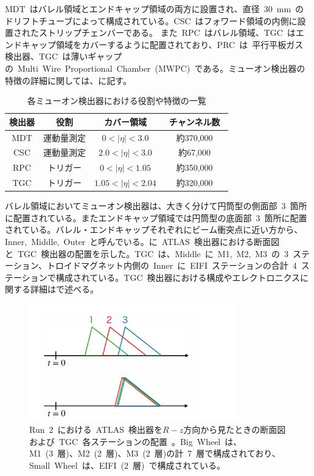 MDT~はバレル領域とエンドキャップ領域の両方に設置され、直径~30~mm~のドリフトチューブによって構成されている。CSC~はフォワード領域の内側に設置されたストリップチェンバーである。 また~RPC~はバレル領域、TGC~はエンドキャップ領域をカバーするように配置されており、PRC~は~平行平板ガス検出器、TGC~は薄いギャップの~Multi~Wire~Proportional~Chamber~(MWPC)~である。ミューオン検出器の特徴の詳細に関しては、に記す。
\begin{table}[tbp]
	\centering
	\begin{tabular}{c|ccc}\hline
	    検出器 & 役割 & カバー領域 & チャンネル数　\\ \hline\hline
		MDT & 運動量測定 & $0<|\eta|<3.0$ & 約370,000 \\ 
		CSC & 運動量測定 & $2.0<|\eta|<3.0$ & 約67,000 \\
        RPC & トリガー & $0<|\eta|<1.05$ & 約350,000 \\
        TGC & トリガー & $1.05<|\eta|<2.04$ & 約320,000 \\ \hline 
	\end{tabular}
	\caption{各ミューオン検出器における役割や特徴の一覧}
    \label{tb:muon}
\end{table}

バレル領域においてミューオン検出器は、大きく分けて円筒型の側面部~3~箇所に配置されている。またエンドキャップ領域では円筒型の底面部~3~箇所に配置されている。バレル・エンドキャップそれぞれにビーム衝突点に近い方から、Inner,~Middle,~Outer~と呼んでいる。に~ATLAS~検出器における断面図と~TGC~検出器の配置を示した。TGC~は、Middle~に~M1,~M2,~M3~の~3~ステーション、トロイドマグネット内側の~Inner~に~EIFI~ステーションの合計~4~ステーションで構成されている。TGC~検出器における構成やエレクトロニクスに関する詳細はで述べる。
\begin{figure}[tbp]
    \centering
    \includegraphics[width=0.8\textwidth,page=7]{img/slide/slide.pdf}
    \caption[Run~2~における~ATLAS~検出器を$R-z$方向から見たときの断面図および~TGC~各ステーションの配置]{Run~2~における~ATLAS~検出器を$R-z$方向から見たときの断面図および~TGC~各ステーションの配置~\cite{TR:01}。Big~Wheel~は、M1~(3~層)、M2~(2~層)、M3~(2~層)の計~7~層で構成されており、Small~Wheel~は、EIFI~(2~層)~で構成されている。}\label{fig:tgc000}
\end{figure}

